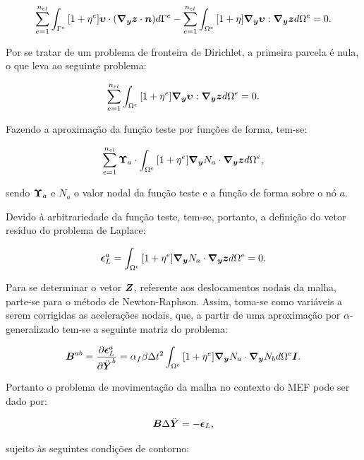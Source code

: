 \begin{equation}
    \sum_{e=1}^{n_{el}}{\int_{\Gamma^e}{[1+\eta^e]\boldsymbol{\upsilon}\cdot(\boldsymbol{\nabla_y}\boldsymbol{z}\cdot\boldsymbol{n}) d\Gamma^e}}-\sum_{e=1}^{n_{el}}{\int_{\Omega^e}{[1+\eta]\boldsymbol{\nabla_y}\boldsymbol{\upsilon}:\boldsymbol{\nabla_y}\boldsymbol{z} d\Omega^e}}=0\text{.}
\end{equation}

Por se tratar de um problema de fronteira de Dirichlet, a primeira parcela é nula, o que leva ao seguinte problema:

\begin{equation}
    \sum_{e=1}^{n_{el}}{\int_{\Omega^e}{[1+\eta^e]\boldsymbol{\nabla_y}\boldsymbol{\upsilon}:\boldsymbol{\nabla_y}\boldsymbol{z} d\Omega^e}}=0\text{.}
\end{equation}

Fazendo a aproximação da função teste por funções de forma, tem-se:

\begin{equation}
    \sum_{e=1}^{n_{el}}{\boldsymbol{\Upsilon}_a\cdot\int_{\Omega^e}{[1+\eta^e]\boldsymbol{\nabla_y} N_a\cdot\boldsymbol{\nabla_y}\boldsymbol{z} d\Omega^e}}\text{,}
\end{equation}

\noindent sendo $\boldsymbol{\Upsilon}_a$ e $N_a$ o valor nodal da função teste e a função de forma sobre o nó $a$.

Devido à arbitrariedade da função teste, tem-se, portanto, a definição do vetor resíduo do problema de Laplace:

\begin{equation}
    \boldsymbol{\epsilon}_L^a=\int_{\Omega^e}{[1+\eta^e]\boldsymbol{\nabla_y} N_a\cdot\boldsymbol{\nabla_y}\boldsymbol{z} d\Omega^e}=0\text{.}
    \label{eq:resLapl}
\end{equation}

Para se determinar o vetor $\boldsymbol{Z}$, referente aos deslocamentos nodais da malha, parte-se para o método de Newton-Raphson. Assim, toma-se como variáveis a serem corrigidas as acelerações nodais, que, a partir de uma aproximação por $\alpha$-generalizado tem-se a seguinte matriz do problema:

\begin{equation}
    \boldsymbol{B}^{ab}=\frac{\partial{\boldsymbol{\epsilon}_L^a}}{\partial{\ddot{\boldsymbol{Y}}^b}}=\alpha_f\beta\Delta t^2\int_{\Omega^e}{[1+\eta^e]\boldsymbol{\nabla_y} N_a\cdot\boldsymbol{\nabla_y} N_b d\Omega^e}\boldsymbol{I}\text{.}
    \label{eq:movMatriz}
\end{equation}

Portanto o problema de movimentação da malha no contexto do MEF pode ser dado por:

\begin{equation}
    \boldsymbol{B}\Delta\ddot{\boldsymbol{Y}}=-\boldsymbol{\epsilon}_L\text{,}
    \label{eq:sistLapl}
\end{equation}

\noindent sujeito às seguintes condições de contorno:

